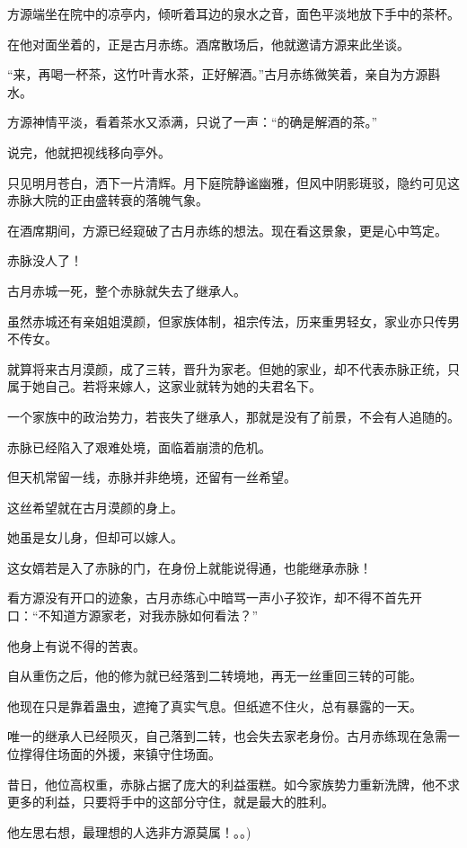 \begin{this_body}
方源端坐在院中的凉亭内，倾听着耳边的泉水之音，面色平淡地放下手中的茶杯。

在他对面坐着的，正是古月赤练。酒席散场后，他就邀请方源来此坐谈。

“来，再喝一杯茶，这竹叶青水茶，正好解酒。”古月赤练微笑着，亲自为方源斟水。

方源神情平淡，看着茶水又添满，只说了一声：“的确是解酒的茶。”

说完，他就把视线移向亭外。

只见明月苍白，洒下一片清辉。月下庭院静谧幽雅，但风中阴影斑驳，隐约可见这赤脉大院的正由盛转衰的落魄气象。

在酒席期间，方源已经窥破了古月赤练的想法。现在看这景象，更是心中笃定。

赤脉没人了！

古月赤城一死，整个赤脉就失去了继承人。

虽然赤城还有亲姐姐漠颜，但家族体制，祖宗传法，历来重男轻女，家业亦只传男不传女。

就算将来古月漠颜，成了三转，晋升为家老。但她的家业，却不代表赤脉正统，只属于她自己。若将来嫁人，这家业就转为她的夫君名下。

一个家族中的政治势力，若丧失了继承人，那就是没有了前景，不会有人追随的。

赤脉已经陷入了艰难处境，面临着崩溃的危机。

但天机常留一线，赤脉并非绝境，还留有一丝希望。

这丝希望就在古月漠颜的身上。

她虽是女儿身，但却可以嫁人。

这女婿若是入了赤脉的门，在身份上就能说得通，也能继承赤脉！

看方源没有开口的迹象，古月赤练心中暗骂一声小子狡诈，却不得不首先开口：“不知道方源家老，对我赤脉如何看法？”

他身上有说不得的苦衷。

自从重伤之后，他的修为就已经落到二转境地，再无一丝重回三转的可能。

他现在只是靠着蛊虫，遮掩了真实气息。但纸遮不住火，总有暴露的一天。

唯一的继承人已经陨灭，自己落到二转，也会失去家老身份。古月赤练现在急需一位撑得住场面的外援，来镇守住场面。

昔日，他位高权重，赤脉占据了庞大的利益蛋糕。如今家族势力重新洗牌，他不求更多的利益，只要将手中的这部分守住，就是最大的胜利。

他左思右想，最理想的人选非方源莫属！。。)

\end{this_body}

